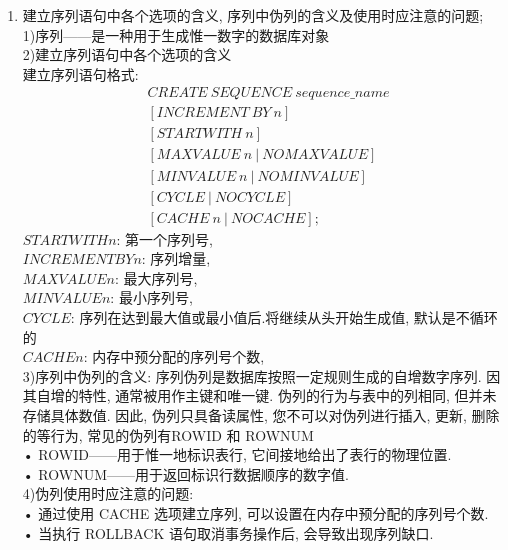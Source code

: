 \documentclass{article}                     %
\numberwithin{equation}{section}            %
\numberwithin{figure}{section}              %
\numberwithin{table}{section}               %
\begin{document}
\begin{enumerate}
\item 建立序列语句中各个选项的含义, 序列中伪列的含义及使用时应注意的问题; \\
1)序列——是一种用于生成惟一数字的数据库对象\\
2)建立序列语句中各个选项的含义\\
建立序列语句格式: 
\begin{align*}
&CREATE\ SEQUENCE\ sequence\_name\\
&[INCREMENT\ BY\ n]\\
&[START WITH\ n]\\
&[{MAXVALUE\ n\ |\ NOMAXVALUE}]\\
&[{MINVALUE\ n\ |\ NOMINVALUE}]\\
&[{CYCLE\ |\ NOCYCLE}]\\
&[{CACHE\ n\ |\ NOCACHE}];
\end{align*}
$START WITH n$: 第一个序列号, \\
$INCREMENT BY n$: 序列增量, \\
$MAXVALUE n$: 最大序列号, \\
$MINVALUE n$: 最小序列号, \\
$CYCLE$: 序列在达到最大值或最小值后.将继续从头开始生成值, 默认是不循环的\\
$CACHE n$: 内存中预分配的序列号个数, \\
3)序列中伪列的含义: 序列伪列是数据库按照一定规则生成的自增数字序列. 因其自增的特性, 通常被用作主键和唯一键. 伪列的行为与表中的列相同, 但并未存储具体数值. 因此, 伪列只具备读属性, 您不可以对伪列进行插入, 更新, 删除的等行为, 常见的伪列有ROWID 和 ROWNUM\\
• ROWID——用于惟一地标识表行, 它间接地给出了表行的物理位置. \\
• ROWNUM——用于返回标识行数据顺序的数字值. \\
4)伪列使用时应注意的问题: \\
• 通过使用 CACHE 选项建立序列, 可以设置在内存中预分配的序列号个数. \\
• 当执行 ROLLBACK 语句取消事务操作后, 会导致出现序列缺口. \\

\end{enumerate}
\end{document}
